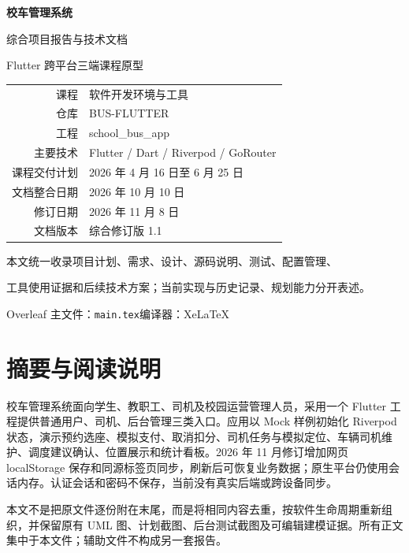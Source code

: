 \documentclass[UTF8,fontset=fandol,zihao=-4,oneside]{ctexrep}
\begin{document}
\begin{titlepage}
\centering
\vspace*{2cm}
{\Huge\bfseries 校车管理系统\par}
\vspace{0.8cm}
{\LARGE 综合项目报告与技术文档\par}
\vspace{0.6cm}
{\Large Flutter 跨平台三端课程原型\par}
\vspace{2cm}
\begin{tabular}{rl}
课程 & 软件开发环境与工具 \\
仓库 & BUS-FLUTTER \\
工程 & school\_bus\_app \\
主要技术 & Flutter / Dart / Riverpod / GoRouter \\
课程交付计划 & 2026 年 4 月 16 日至 6 月 25 日 \\
文档整合日期 & 2026 年 10 月 10 日 \\
修订日期 & 2026 年 11 月 8 日 \\
文档版本 & 综合修订版 1.1 \\
\end{tabular}
\vfill
本文统一收录项目计划、需求、设计、源码说明、测试、配置管理、\par
工具使用证据和后续技术方案；当前实现与历史记录、规划能力分开表述。\par
\vspace{1cm}
Overleaf 主文件：\texttt{main.tex}\quad 编译器：XeLaTeX\par
\end{titlepage}

\chapter*{摘要与阅读说明}
校车管理系统面向学生、教职工、司机及校园运营管理人员，采用一个 Flutter 工程提供普通用户、司机、后台管理三类入口。应用以 Mock 样例初始化 Riverpod 状态，演示预约选座、模拟支付、取消扣分、司机任务与模拟定位、车辆司机维护、调度建议确认、位置展示和统计看板。2026 年 11 月修订增加网页 localStorage 保存和同源标签页同步，刷新后可恢复业务数据；原生平台仍使用会话内存。认证会话和密码不保存，当前没有真实后端或跨设备同步。

本文不是把原文件逐份附在末尾，而是将相同内容去重，按软件生命周期重新组织，并保留原有 UML 图、计划截图、后台测试截图及可编辑建模证据。所有正文集中于本文件；辅助文件不构成另一套报告。
\end{document}
